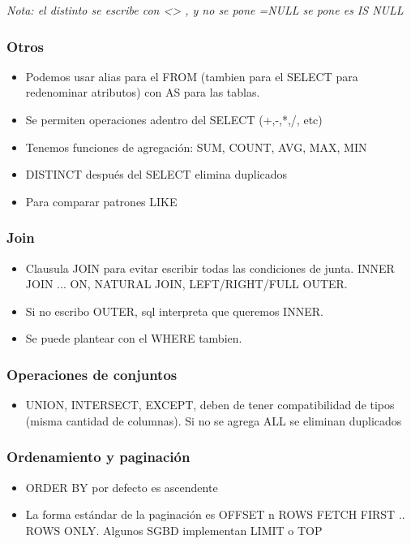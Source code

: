 \medskip
\textit{Nota: el distinto se escribe con <> , y no se pone =NULL se pone es IS NULL}

\subsubsection*{Otros}
\medskip
\begin{itemize}
\item Podemos usar alias para el FROM (tambien para el SELECT para redenominar atributos) con AS para las tablas.
\item Se permiten operaciones adentro del SELECT (+,-,*,/, etc)
\item Tenemos funciones de agregación: SUM, COUNT, AVG, MAX, MIN
\item DISTINCT después del SELECT elimina duplicados
\item Para comparar patrones LIKE
\end{itemize}


\subsubsection*{Join}
\begin{itemize}
\item Clausula JOIN para evitar escribir todas las condiciones de junta. INNER JOIN ... ON, NATURAL JOIN, LEFT/RIGHT/FULL OUTER.
\item Si no escribo OUTER, sql interpreta que queremos INNER.
\item Se puede plantear con el WHERE tambien.
\end{itemize}



\subsubsection*{Operaciones de conjuntos}
\begin{itemize}
\item UNION, INTERSECT, EXCEPT, deben de tener compatibilidad de tipos (misma cantidad de columnas). Si no se agrega ALL se eliminan duplicados
\end{itemize}


\subsubsection*{Ordenamiento y paginación}
\begin{itemize}
\item ORDER BY por defecto es ascendente
\item La forma estándar de la paginación es OFFSET n ROWS FETCH FIRST .. ROWS ONLY. Algunos SGBD implementan LIMIT o TOP
\end{itemize}

